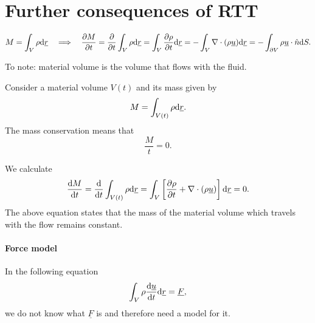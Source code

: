 \documentclass[11pt,oneside]{book}
\renewcommand{\vec}[1]{\underline{#1}}
\theoremstyle{definition} %
\theoremstyle{plain} %
\theoremstyle{remark} %
\theoremstyle{underline}
\begin{document}
  \section{Further consequences of RTT}

  \begin{figure}[ht]
    \centering
  \end{figure}

  
  \begin{displaymath}
    M = \int_V \rho \d \vec r \qLRa \ptf{M}{t} 
    = \ptf{}{t} \int_V \rho \d \vec r 
    = \int_V \ptf{\rho}{t} \d \vec r 
    = - \int_V \nabla \cdot (\rho \vec u) \d \vec r
    = - \int_{\partial V} \rho \vec u \cdot \hat n \d S .
  \end{displaymath}

  To note: material volume is the volume that flows with the fluid.
  

  Consider a material volume $V(t)$ and its mass given by
  \begin{displaymath}
    M = \int_{V(t)}  \rho \d \vec r.
  \end{displaymath}
  The mass conservation means that
  \begin{displaymath}
    \dfrac{M}{t} = 0.
  \end{displaymath}

  We calculate
  \begin{displaymath}
    \dfrac{M}{t} = \dfrac{}{t} \int_{V(t)} \rho \d \vec r 
    = \int_V \left[ \ptf{\rho}{t} + \nabla \cdot (\rho \vec u) \right]\d \vec r 
    = 0.
  \end{displaymath}
  The above equation states that the mass of the material volume which travels with the flow remains constant.
  
  \paragraph{Force model}
  In the following equation
  \begin{displaymath}
    \int_V \rho \dfrac{\vec u}{t} \d \vec r = \vec F,
  \end{displaymath}
  we do not know what $\vec F$ is and therefore need a model for it.
\end{document}

